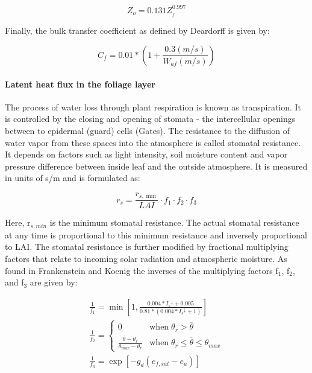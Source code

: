 \begin{equation}
{Z_o} = 0.131Z_{_f}^{0.997}
\end{equation}

Finally, the bulk transfer coefficient as defined by Deardorff is given by:

\begin{equation}
{C_f} = 0.01*\left( {1 + \frac{{0.3(m/s)}}{{{W_{af}}(m/s)}}} \right)
\end{equation}

\paragraph{Latent heat flux in the foliage layer}\label{latent-heat-flux-in-the-foliage-layer}

The process of water loss through plant respiration is known as transpiration. It is controlled by the closing and opening of stomata - the intercellular openings between to epidermal (guard) cells (Gates). The resistance to the diffusion of water vapor from these spaces into the atmosphere is called stomatal resistance. It depends on factors such as light intensity, soil moisture content and vapor pressure difference between inside leaf and the outside atmosphere. It is measured in units of s/m and is formulated as:

\begin{equation}
{r_s} = \frac{{{r_{s,\min }}}}{{LAI}} \cdot {f_1} \cdot {f_2} \cdot {f_3}
\end{equation}

Here, r\(_{s,min}\) is the minimum stomatal resistance. The actual stomatal resistance at any time is proportional to this minimum resistance and inversely proportional to LAI. The stomatal resistance is further modified by fractional multiplying factors that relate to incoming solar radiation and atmospheric moisture. As found in Frankenstein and Koenig the inverses of the multiplying factors f\(_{1}\), f\(_{2}\), and f\(_{3}\) are given by:

\begin{equation}
\begin{array}{l}
   \frac{1}{f_1} = \min \left[ 1,\frac{{0.004*{I_s}^ \downarrow  + 0.005}}{{0.81*(0.004*{I_s}^ \downarrow  + 1)}} \right] \\
   \frac{1}{f_2} = \left\{
     \begin{array}{cl}
       0                                                                 & \text{when} \; \theta_r > \overline \theta \\
       \frac{ \overline \theta   - \theta_r }{ \theta_{max} - \theta_r } & \text{when} \; \theta_r \leq \overline \theta \leq \theta_{max}
     \end{array} \right. \\
   \frac{1}{f_3} = \exp \left[ - {g_d}({e_{f,sat}} - {e_a}) \right]
\end{array}
\end{equation}

